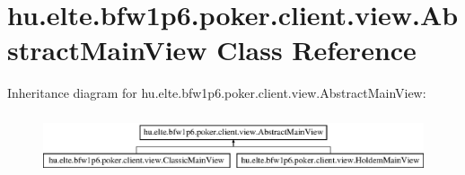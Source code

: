 \hypertarget{classhu_1_1elte_1_1bfw1p6_1_1poker_1_1client_1_1view_1_1_abstract_main_view}{}\section{hu.\+elte.\+bfw1p6.\+poker.\+client.\+view.\+Abstract\+Main\+View Class Reference}
\label{classhu_1_1elte_1_1bfw1p6_1_1poker_1_1client_1_1view_1_1_abstract_main_view}
Inheritance diagram for hu.\+elte.\+bfw1p6.\+poker.\+client.\+view.\+Abstract\+Main\+View\+:\begin{figure}[H]
\begin{center}
\leavevmode
\includegraphics[height=1.806452cm]{classhu_1_1elte_1_1bfw1p6_1_1poker_1_1client_1_1view_1_1_abstract_main_view}
\end{center}
\end{figure}
